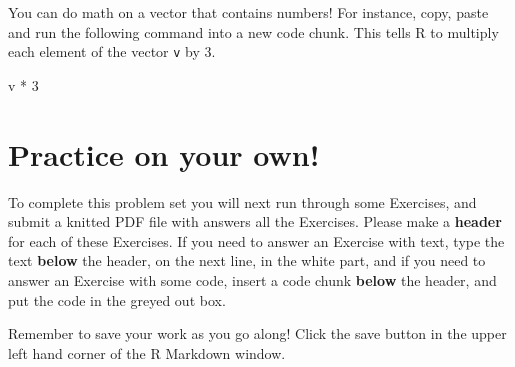 \documentclass[
]{article}
\newenvironment{Shaded}{\begin{snugshade}}{\end{snugshade}}
\newcommand{\DecValTok}[1]{\textcolor[rgb]{0.00,0.00,0.81}{#1}}
\newcommand{\NormalTok}[1]{#1}
\newcommand{\SpecialCharTok}[1]{\textcolor[rgb]{0.00,0.00,0.00}{#1}}
\begin{document}
You can do math on a vector that contains numbers! For instance, copy,
paste and run the following command into a new code chunk. This tells R
to multiply each element of the vector \texttt{v} by 3.

\begin{Shaded}
\begin{Highlighting}[]
\NormalTok{v }\SpecialCharTok{*} \DecValTok{3}
\end{Highlighting}
\end{Shaded}

\hypertarget{practice-on-your-own}{%
\section{Practice on your own!}\label{practice-on-your-own}}

To complete this problem set you will next run through some Exercises,
and submit a knitted PDF file with answers all the Exercises. Please
make a \textbf{header} for each of these Exercises. If you need to
answer an Exercise with text, type the text \textbf{below} the header,
on the next line, in the white part, and if you need to answer an
Exercise with some code, insert a code chunk \textbf{below} the header,
and put the code in the greyed out box.

\leavevmode\hypertarget{license}{}%
Remember to save your work as you go along! Click the save button in the
upper left hand corner of the R Markdown window.
\end{document}
